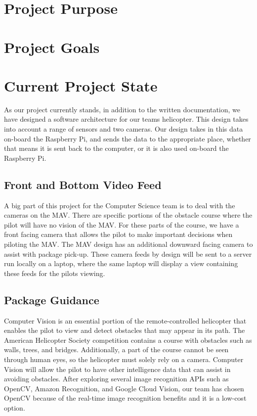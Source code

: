 \documentclass[onecolumn, oneside, letterpaper, draftclsnofoot, 10pt, compsoc]{IEEEtran}
\begin{document}
\section{Project Purpose}

\section{Project Goals}

\section{Current Project State}
As our project currently stands, in addition to the written documentation, we have designed a software architecture for our teams helicopter. This design takes into account a range of sensors and two cameras. Our design takes in this data on-board the Raspberry Pi, and sends the data to the appropriate place, whether that means it is sent back to the computer, or it is also used on-board the Raspberry Pi.


\subsection{Front and Bottom Video Feed}
A big part of this project for the Computer Science team is to deal with the cameras on the MAV. There are specific portions of the obstacle course where the pilot will have no vision of the MAV. For these parts of the course, we have a front facing camera that allows the pilot to make important decisions when piloting the MAV. The MAV design has an additional downward facing camera to assist with package pick-up. These camera feeds by design will be sent to a server run locally on a laptop, where the same laptop will display a view containing these feeds for the pilot\textquotesingle s viewing.


\subsection{Package Guidance}
Computer Vision is an essential portion of the remote-controlled helicopter that enables the pilot to view and detect obstacles that may appear in its path. The American Helicopter Society competition contains a course with obstacles such as walls, trees, and bridges. Additionally, a part of the course cannot be seen through human eyes, so the helicopter must solely rely on a camera. Computer Vision will allow the pilot to have other intelligence data that can assist in avoiding obstacles. After exploring several image recognition APIs such as OpenCV, Amazon Recognition, and Google Cloud Vision, our team has chosen OpenCV because of the real-time image recognition benefits and it is a low-cost option.
\end{document}
